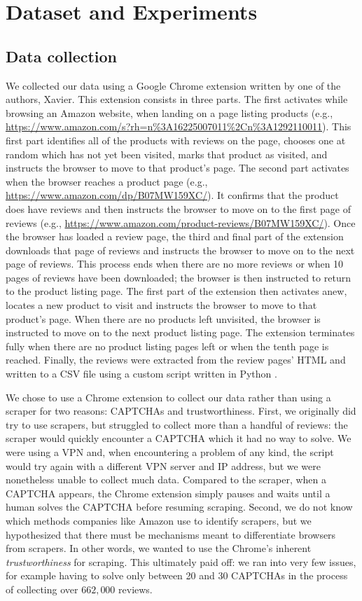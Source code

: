 \documentclass[11pt,a4paper]{article}
\begin{document}
\section{Dataset and Experiments}
\subsection{Data collection}
We collected our data using a Google Chrome extension written by one of the authors, Xavier. This extension consists in three parts. The first activates while browsing an Amazon website, when landing on a page listing products (e.g., \url{https://www.amazon.com/s?rh=n\%3A16225007011\%2Cn\%3A1292110011}). This first part identifies all of the products with reviews on the page, chooses one at random which has not yet been visited, marks that product as visited, and instructs the browser to move to that product's page. The second part activates when the browser reaches a product page (e.g., \url{https://www.amazon.com/dp/B07MW159XC/}). It confirms that the product does have reviews and then instructs the browser to move on to the first page of reviews (e.g., \url{https://www.amazon.com/product-reviews/B07MW159XC/}). Once the browser has loaded a review page, the third and final part of the extension downloads that page of reviews and instructs the browser to move on to the next page of reviews. This process ends when there are no more reviews or when 10 pages of reviews have been downloaded; the browser is then instructed to return to the product listing page. The first part of the extension then activates anew, locates a new product to visit and instructs the browser to move to that product's page. When there are no products left unvisited, the browser is instructed to move on to the next product listing page. The extension terminates fully when there are no product listing pages left or when the tenth page is reached. Finally, the reviews were extracted from the review pages' HTML and written to a CSV file using a custom script written in Python \cite{python3}.

We chose to use a Chrome extension to collect our data rather than using a scraper for two reasons: CAPTCHAs and trustworthiness. First, we originally did try to use scrapers, but struggled to collect more than a handful of reviews: the scraper would quickly encounter a CAPTCHA which it had no way to solve. We were using a VPN and, when encountering a problem of any kind, the script would try again with a different VPN server and IP address, but we were nonetheless unable to collect much data. Compared to the scraper, when a CAPTCHA appears, the Chrome extension simply pauses and waits until a human solves the CAPTCHA before resuming scraping. Second, we do not know which methods companies like Amazon use to identify scrapers, but we hypothesized that there must be mechanisms meant to differentiate browsers from scrapers. In other words, we wanted to use the Chrome's inherent \textit{trustworthiness} for scraping. This ultimately paid off: we ran into very few issues, for example having to solve only between 20 and 30 CAPTCHAs in the process of collecting over $662,000$ reviews. 
\end{document}
